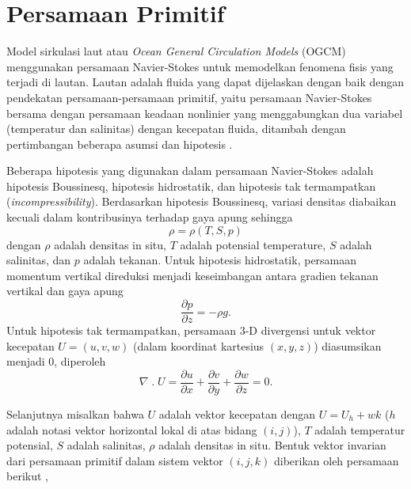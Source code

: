 \section[Persamaan Primitif]{Persamaan Primitif}
\begin{spacing}{1.5}
	\par Model sirkulasi laut atau \textit{Ocean General Circulation Models} (OGCM) menggunakan persamaan Navier-Stokes untuk memodelkan fenomena fisis yang terjadi di lautan. Lautan adalah fluida yang dapat dijelaskan dengan baik dengan pendekatan persamaan-persamaan primitif, yaitu persamaan Navier-Stokes bersama dengan persamaan keadaan nonlinier yang menggabungkan dua variabel (temperatur dan salinitas) dengan kecepatan fluida, ditambah dengan pertimbangan beberapa asumsi dan hipotesis .
	
	Beberapa hipotesis yang digunakan dalam persamaan Navier-Stokes adalah hipotesis Boussinesq, hipotesis hidrostatik, dan hipotesis tak termampatkan (\textit{incompressibility}). Berdasarkan hipotesis Boussinesq, variasi densitas diabaikan kecuali dalam kontribusinya terhadap gaya apung sehingga 
	\begin{equation}\label{eq:P1}
		\rho = \rho(T,S,p)
	\end{equation}
	dengan $\rho$ adalah densitas in situ, $T$ adalah potensial temperature, $S$ adalah salinitas, dan $p$ adalah tekanan.
	Untuk hipotesis hidrostatik, persamaan momentum vertikal direduksi menjadi keseimbangan antara gradien tekanan vertikal dan gaya apung
	\begin{equation}
		\frac{\partial p}{\partial z} = -\rho g.
	\end{equation}
	Untuk hipotesis tak termampatkan, persamaan 3-D divergensi untuk vektor kecepatan $U = (u,v,w)$ (dalam koordinat kartesius $(x,y,z)$) diasumsikan menjadi 0, diperoleh
	\begin{equation}
		\nabla \;.\; U =\frac{\partial u}{\partial x} + \frac{\partial v}{\partial y} + \frac{\partial w}{\partial z} = 0.
	\end{equation}	

	Selanjutnya misalkan bahwa $U$ adalah vektor kecepatan dengan $U = U_h + wk$ ($h$ adalah notasi vektor horizontal lokal di atas bidang $(i,j)$), $T$ adalah temperatur potensial, $S$ adalah salinitas, $\rho$ adalah densitas in situ. Bentuk vektor invarian dari persamaan primitif dalam sistem vektor $(i, j, k)$ diberikan oleh persamaan berikut ,
	

\end{spacing}
